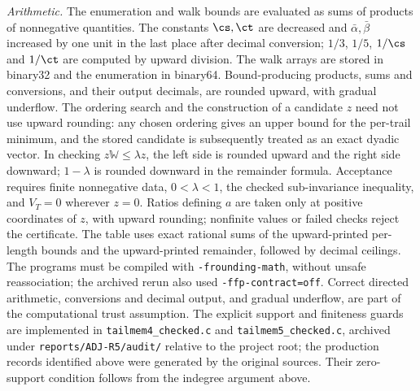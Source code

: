 \emph{Arithmetic.}
The enumeration and walk bounds are evaluated as sums of products of nonnegative quantities.
The constants $\cs,\ct$ are decreased and $\bar\alpha,\bar\beta$ increased by one unit in the last place after decimal conversion;
$1/3$, $1/5$, $1/\cs$ and $1/\ct$ are computed by upward division.
The walk arrays are stored in binary32 and the enumeration in binary64.
Bound-producing products, sums and conversions, and their output decimals, are rounded upward, with gradual underflow.
The ordering search and the construction of a candidate $z$ need not use upward rounding: any chosen ordering gives an upper bound for the per-trail minimum, and the stored candidate is subsequently treated as an exact dyadic vector.
In checking $z\mathbb W\le\lambda z$, the left side is rounded upward and the right side downward; $1-\lambda$ is rounded downward in the remainder formula.
Acceptance requires finite nonnegative data, $0<\lambda<1$, the checked sub-invariance inequality, and $V_T=0$ wherever $z=0$.
Ratios defining $a$ are taken only at positive coordinates of $z$, with upward rounding; nonfinite values or failed checks reject the certificate.
The table uses exact rational sums of the upward-printed per-length bounds and the upward-printed remainder, followed by decimal ceilings.
The programs must be compiled with \texttt{-frounding-math}, without unsafe reassociation; the archived rerun also used \texttt{-ffp-contract=off}.
Correct directed arithmetic, conversions and decimal output, and gradual underflow, are part of the computational trust assumption.
The explicit support and finiteness guards are implemented in \texttt{tailmem4\_checked.c} and \texttt{tailmem5\_checked.c}, archived under \texttt{reports/ADJ-R5/audit/} relative to the project root; the production records identified above were generated by the original sources. Their zero-support condition follows from the indegree argument above.


